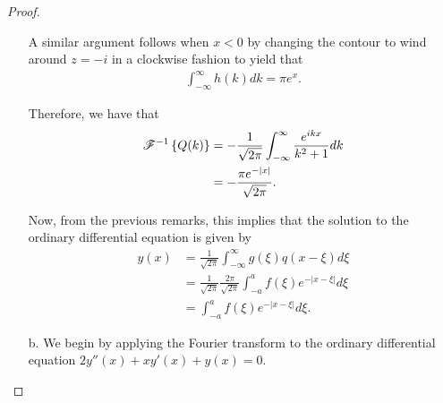 \begin{proof}
\begin{enumerate}
      A similar argument follows when $x < 0$ by changing the contour to wind around $z=-i$ in a clockwise fashion to yield that
      \begin{align*}
        \int_{-\infty}^{\infty} h(k) dk = \pi e^{x}.
      \end{align*}

      Therefore, we have that
      \begin{align*}
        \mathscr{F}^{-1}\left\{ {Q(k)} \right\} &= -\frac{1}{\sqrt{2\pi}} \int_{-\infty}^{\infty} \frac{e^{i k x}}{k^2+1}  dk \\
        &= -\frac{\pi e^{-|x|}}{\sqrt{2\pi}}.
      \end{align*}

      Now, from the previous remarks, this implies that the solution to the ordinary
      differential equation is given by
      \begin{align*}
        y(x) &= \frac{1}{\sqrt{2\pi}}\int_{-\infty}^{\infty} g(\xi) q(x-\xi)d\xi \\
        &= \frac{1}{\sqrt{2\pi}}\frac{2\pi}{\sqrt{2\pi}}\int_{-a}^{a} f(\xi) e^{-|x-\xi|} d\xi \\
        &= \int_{-a}^{a} f(\xi) e^{-|x-\xi|} d\xi.
      \end{align*}
    \item[b.] We begin by applying the Fourier transform
      to the ordinary differential equation $2 y''(x) + x y'(x) + y(x) = 0$.
  \end{enumerate}
\end{proof}
\newpage
